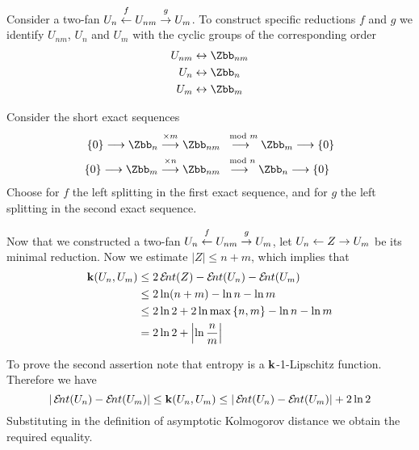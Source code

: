 \begin{Proof} 
  Consider a two-fan $U_{n}\stackrel{f}{\stackrel{}{\leftarrow}} U_{nm}\stackrel{g}{\stackrel{}{\rightarrow}}
  U_{m}$. To construct specific reductions $f$ and $g$ we identify
  $U_{nm}$, $U_{n}$ and $U_{m}$ with the cyclic groups of the
  corresponding order
\begin{align*}
  U_{nm}&\leftrightarrow \Zbb_{nm}\\
  U_{n}&\leftrightarrow\Zbb_{n}\\
  U_{m}&\leftrightarrow\Zbb_{m}
\end{align*}

Consider the short exact sequences
\begin{align*}
  \set{0} \too \Zbb_{n}
  &\stackrel{\times m}{\too}
  \Zbb_{nm}
  \stackrel{\mod m}{\too}
  \Zbb_{m} \too \set{0}\\
  \set{0} \too \Zbb_{m}
  & \stackrel{\times n}{\too}
  \Zbb_{nm}
  \stackrel{\mod n}{\too}
  \Zbb_{n}\too \set{0}\\  
\end{align*}
Choose for $f$ the left splitting in the first exact sequence, and for $g$ the left splitting in the second exact sequence.

Now that we constructed a two-fan $U_{n}\stackrel{f}{\stackrel{}{\leftarrow}} U_{nm}\stackrel{g}{\stackrel{}{\rightarrow}}
U_{m}$, let $U_{n}\stackrel{}{\leftarrow} Z\stackrel{}{\rightarrow} U_{m}$ be its minimal reduction. Now we estimate
$|Z|\leq n+m$, which implies that
\begin{align*}
  \ikd(U_{n},U_{m})
  &\leq
  2\Ent(Z)-\ent(U_{n})-\ent(U_{m})\\
  &\leq
  2\ln(n+m)-\ln n-\ln m\\
  &\leq
  2\ln2+2\ln\max\set{n,m}-\ln n-\ln m\\
  &=2\ln2+\left|\ln\frac{n}{m}\right|
\end{align*}

To prove the second assertion note that entropy is a
$\operatorname{\mathbf{k}}$-1-Lipschitz function. Therefore we have
\[
|\ent(U_{n})-\ent(U_{m})|\leq\ikd(U_{n},U_{m})
\leq
|\ent(U_{n})-\ent(U_{m})|+2\ln2
\]
Substituting in the definition of asymptotic Kolmogorov distance we
obtain the required equality.
\end{Proof}



\let\thesubsection=\thesubsectionstandard
